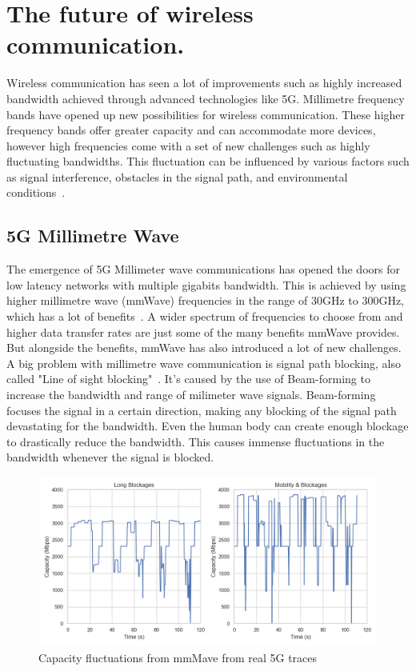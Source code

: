\documentclass[a4paper,english, 12pt]{report}
\begin{document}
\section{The future of wireless communication.}
Wireless communication has seen a lot of improvements such as highly increased bandwidth achieved through advanced technologies like 5G. Millimetre frequency bands have opened up new possibilities for wireless communication. These higher frequency bands offer greater capacity and can accommodate more devices, however high frequencies come with a set of new challenges such as highly fluctuating bandwidths. This fluctuation can be influenced by various factors such as signal interference, obstacles in the signal path, and environmental conditions~\cite{4623710}.

\subsection{5G Millimetre Wave}
The emergence of 5G Millimeter wave communications has opened the doors for low latency networks with multiple gigabits bandwidth. This is achieved by using higher millimetre wave (mmWave) frequencies in the range of 30GHz to 300GHz, which has a lot of benefits~\cite{Agrawal_Sharma_2016}. A wider spectrum of frequencies to choose from and higher data transfer rates are just some of the many benefits mmWave provides. But alongside the benefits, mmWave has also introduced a lot of new challenges.\\

A big problem with millimetre wave communication is signal path blocking, also called "Line of sight blocking"~\cite{mmwave_blocking}. It's caused by the use of Beam-forming to increase the bandwidth and range of milimeter wave signals. Beam-forming focuses the signal in a certain direction, making any blocking of the signal path devastating for the bandwidth. Even the human body can create enough blockage to drastically reduce the bandwidth. This causes immense fluctuations in the bandwidth whenever the signal is blocked.\\

\begin{figure}[h!] %
	\centering
	\includegraphics[scale=0.33]{../diagrams/witestlab/lb_mobb.png}
  	\caption{Capacity fluctuations from mmMave from real 5G traces~\cite{Srivastava_Fund_Panwar_2020}}
  	\label{fig:blockage}
\end{figure}
\end{document}
